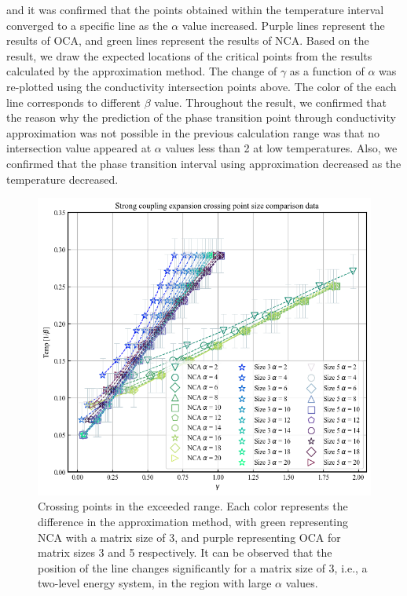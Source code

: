 \documentclass{article}[12pt]
\begin{document}
\begin{spacing}{1.5}
and it was confirmed that the points obtained within the temperature interval converged to a specific line as the $\alpha$ value increased. 
Purple lines represent the results of OCA, and green lines represent the results of NCA. 
Based on the result, we draw the expected locations of the critical points from the results calculated by the approximation method. 
The change of $\gamma$ as a function of $\alpha$ was re-plotted using the conductivity intersection points above. 
The color of the each line corresponds to different $\beta$ value.
Throughout the result, we confirmed that the reason why the prediction of the phase transition point through conductivity approximation was not possible 
in the previous calculation range was that no intersection value appeared at $\alpha$ values less than 2 at low temperatures. 
Also, we confirmed that the phase transition interval using approximation decreased as the temperature decreased.
\pagebreak
\begin{figure}[H]
  \centerline{\includegraphics[width=12cm]{TexFigure/output.png}}
  \caption{Crossing points in the exceeded range. Each color represents the difference in the approximation method, 
  with green representing NCA with a matrix size of 3,  and purple representing OCA for matrix sizes 3 and 5 respectively. 
  It can be observed that the position of the line changes significantly for a matrix size of 3, i.e., a two-level energy system, 
  in the region with large $\alpha$ values.}
\end{figure}
\begin{figure}[htbp]

\end{figure}
\end{spacing}
\end{document}

